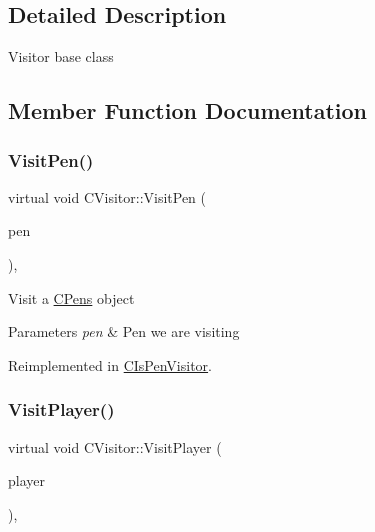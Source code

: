 \subsection{Detailed Description}
Visitor base class 

\subsection{Member Function Documentation}
\mbox{\label{class_c_visitor_ab4ba1c148a5672a48a40596e9ac5a72c}} 
\subsubsection{\texorpdfstring{VisitPen()}{VisitPen()}}
{\footnotesize\ttfamily virtual void C\+Visitor\+::\+Visit\+Pen (\begin{DoxyParamCaption}\item[{\mbox{\hyperlink{class_c_pens}{C\+Pens}} $\ast$}]{pen }\end{DoxyParamCaption})\hspace{0.3cm}{\ttfamily [inline]}, {\ttfamily [virtual]}}

Visit a \mbox{\hyperlink{class_c_pens}{C\+Pens}} object 
\begin{DoxyParams}{Parameters}
{\em pen} & Pen we are visiting \\
\hline
\end{DoxyParams}


Reimplemented in \mbox{\hyperlink{class_c_is_pen_visitor_ae48fb8bb94e5d10877ad5669df4bb86c}{C\+Is\+Pen\+Visitor}}.

\mbox{\label{class_c_visitor_af177b31b3af36c3eeb8eb70fef63a75c}} 
\subsubsection{\texorpdfstring{VisitPlayer()}{VisitPlayer()}}
{\footnotesize\ttfamily virtual void C\+Visitor\+::\+Visit\+Player (\begin{DoxyParamCaption}\item[{\mbox{\hyperlink{class_c_player}{C\+Player}} $\ast$}]{player }\end{DoxyParamCaption})\hspace{0.3cm}{\ttfamily [inline]}, {\ttfamily [virtual]}}

